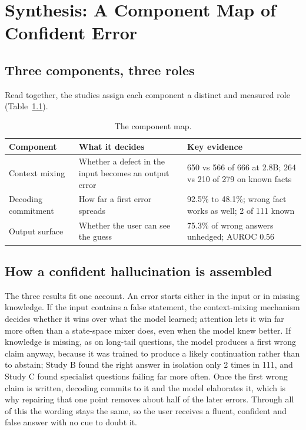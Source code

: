 \documentclass[11pt,a4paper,oneside]{report}
\begin{document}
\chapter{Synthesis: A Component Map of Confident Error}
\label{ch:synthesis}

\section{Three components, three roles}
Read together, the studies assign each component a distinct and measured role (Table~\ref{tab:map}).

\begin{table}[h]
\centering\small
\caption{The component map.}
\label{tab:map}
\begin{tabularx}{\linewidth}{@{}p{2.6cm}Xp{4.2cm}@{}}
\toprule
Component & What it decides & Key evidence\\
\midrule
Context mixing & Whether a defect in the input becomes an output error & 650 vs 566 of 666 at 2.8B; 264 vs 210 of 279 on known facts\\
Decoding commitment & How far a first error spreads & 92.5\% to 48.1\%; wrong fact works as well; 2 of 111 known\\
Output surface & Whether the user can see the guess & 75.3\% of wrong answers unhedged; AUROC 0.56\\
\bottomrule
\end{tabularx}
\end{table}

\section{How a confident hallucination is assembled}
The three results fit one account. An error starts either in the input or in missing knowledge. If the input contains a false statement, the context-mixing mechanism decides whether it wins over what the model learned; attention lets it win far more often than a state-space mixer does, even when the model knew better. If knowledge is missing, as on long-tail questions, the model produces a first wrong claim anyway, because it was trained to produce a likely continuation rather than to abstain; Study B found the right answer in isolation only 2 times in 111, and Study C found specialist questions failing far more often. Once the first wrong claim is written, decoding commits to it and the model elaborates it, which is why repairing that one point removes about half of the later errors. Through all of this the wording stays the same, so the user receives a fluent, confident and false answer with no cue to doubt it.
\end{document}
